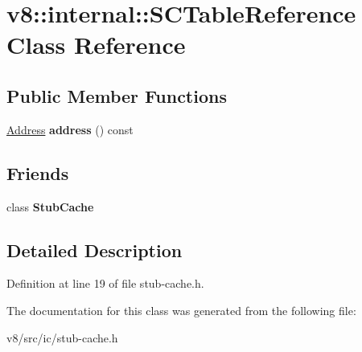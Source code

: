 \hypertarget{classv8_1_1internal_1_1SCTableReference}{}\section{v8\+:\+:internal\+:\+:S\+C\+Table\+Reference Class Reference}
\label{classv8_1_1internal_1_1SCTableReference}
\subsection*{Public Member Functions}
\begin{DoxyCompactItemize}
\item 
\mbox{\label{classv8_1_1internal_1_1SCTableReference_a24ed0ed0695568aae6c7cae653e35c27}} 
\mbox{\hyperlink{classuintptr__t}{Address}} {\bfseries address} () const
\end{DoxyCompactItemize}
\subsection*{Friends}
\begin{DoxyCompactItemize}
\item 
\mbox{\label{classv8_1_1internal_1_1SCTableReference_a9dd0864bf7d020620606b5f3e1a0452f}} 
class {\bfseries Stub\+Cache}
\end{DoxyCompactItemize}


\subsection{Detailed Description}


Definition at line 19 of file stub-\/cache.\+h.



The documentation for this class was generated from the following file\+:\begin{DoxyCompactItemize}
\item 
v8/src/ic/stub-\/cache.\+h\end{DoxyCompactItemize}
